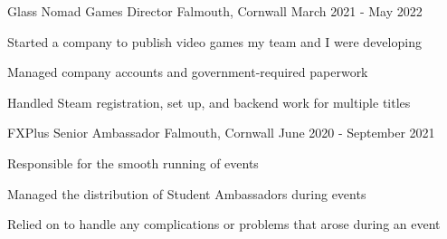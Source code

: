 

\begin{cventries}
    \cventry
        {Glass Nomad Games}
        {Director}
        {Falmouth, Cornwall}
        {March 2021 - May 2022}
        {
            \begin{cvitems}
                \item Started a company to publish video games my team and I were developing
                \item Managed company accounts and government-required paperwork
                \item Handled Steam registration, set up, and backend work for multiple titles
            \end{cvitems}
        }


    \cventry
        {FXPlus}
        {Senior Ambassador}
        {Falmouth, Cornwall}
        {June 2020 - September 2021}
        {
            \begin{cvitems}
                \item Responsible for the smooth running of events
                \item Managed the distribution of Student Ambassadors during events
                \item Relied on to handle any complications or problems that arose during an event
            \end{cvitems}
        }


\end{cventries}
